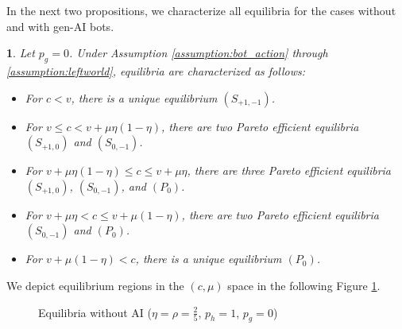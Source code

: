 \documentclass[english,12pt]{article}
\theoremstyle{plain}
\theoremstyle{plain}
\theoremstyle{definition}
\theoremstyle{definition}
\theoremstyle{assumption}
\theoremstyle{plain}
\theoremstyle{plain}
\theoremstyle{plain}
\newtheorem{proposition}{\protect\propositionname}
\theoremstyle{plain}
\theoremstyle{definition}%
\theoremstyle{plain}
\theoremstyle{plain}
\theoremstyle{plain}
\theoremstyle{plain}
\theoremstyle{plain}
\theoremstyle{plain}
\providecommand{\propositionname}{Proposition}
\begin{document}
In the next two propositions, we characterize all equilibria for the cases without and with gen-AI bots. 

\begin{proposition}\label{prop:noAI}
    Let $p_g=0$. Under Assumption \ref{assumption:bot_action} through \ref{assumption:leftworld}, equilibria are characterized as follows:
    \begin{itemize}
        \item[(i)] For $c<v$, there is a unique equilibrium $(S_{+1,-1})$.
        \item[(ii)] For $v\leq c<v+\mu\eta(1-\eta)$, there are two Pareto efficient equilibria $(S_{+1,0})$ and $(S_{0,-1})$.
        \item[(iii)] For $v+\mu\eta(1-\eta)\leq c\leq v+\mu\eta$, there are three Pareto efficient equilibria $(S_{+1,0})$, $(S_{0,-1})$, and $(P_0)$.
        \item[(iv)] For $v+\mu\eta<c\leq v+\mu(1-\eta)$, there are two Pareto efficient equilibria $(S_{0,-1})$ and $(P_0)$.
        \item[(v)] For $v+\mu(1-\eta)<c$, there is a unique equilibrium $(P_0)$.
    \end{itemize}
\end{proposition}

We depict equilibrium regions in the $(c,\mu)$ space in the following Figure \ref{fig:wihoutAI}.

\begin{figure}[H]
\centering
{}
\caption{Equilibria without AI ($\eta=\rho=\frac{2}{5}$, $p_h=1$, $p_g=0$)}
\label{fig:wihoutAI}
\end{figure}
\end{document}

